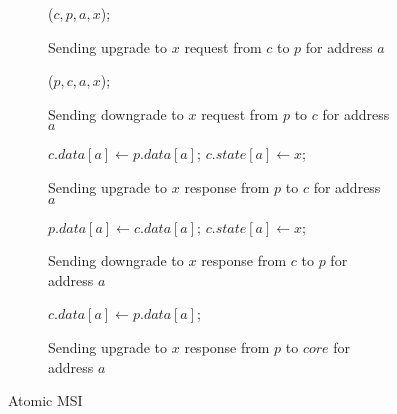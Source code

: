 \begin{figure}

\begin{subfigure}{\linewidth}
\begin{boxedminipage}{\linewidth}
\begin{algorithmic}
  \State \call{} \uReq($c, p, a, x$);
\EndProc
\end{algorithmic}
\end{boxedminipage}
\caption{Sending upgrade to $x$ request from $c$ to $p$ for address $a$}
\label{uReq}
\end{subfigure}

\begin{subfigure}{\linewidth}
\begin{boxedminipage}{\linewidth}
\begin{algorithmic}
  \State \call{} \dReq($p, c, a, x$);
\EndProc
\end{algorithmic}
\end{boxedminipage}
\caption{Sending downgrade to $x$ request from $p$ to $c$ for address $a$}
\label{dReq}
\end{subfigure}

\begin{subfigure}{\linewidth}
\begin{boxedminipage}{\linewidth}
\begin{algorithmic}
      \State $c.data[a] \gets p.data[a]$;
    \EndIf
    \State $c.state[a] \gets x$;
  \EndIf
\EndProc
\end{algorithmic}
\end{boxedminipage}
\caption{Sending upgrade to $x$ response from $p$ to $c$ for address $a$}
\label{uResp}
\end{subfigure}

\begin{subfigure}{\linewidth}
\begin{boxedminipage}{\linewidth}
\begin{algorithmic}
      \State $p.data[a] \gets c.data[a]$;
    \EndIf
    \State $c.state[a] \gets x$;
  \EndIf
\EndProc
\end{algorithmic}
\end{boxedminipage}
\caption{Sending downgrade to $x$ response from $c$ to $p$ for address $a$}
\label{dResp}
\end{subfigure}

\begin{subfigure}{\linewidth}
\begin{boxedminipage}{\linewidth}
\begin{algorithmic}
  \State $c.data[a] \gets p.data[a]$;
\EndProc
\end{algorithmic}
\end{boxedminipage}
\caption{Sending upgrade to $x$ response from $p$ to $core$ for address $a$}
\label{uResp}
\end{subfigure}


\caption{Atomic MSI}
\label{atomic}
\end{figure}


